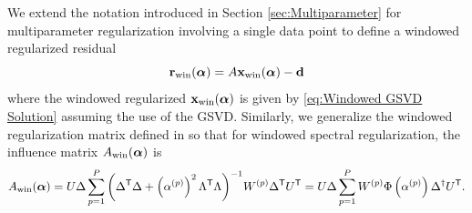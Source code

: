 \documentclass[12pt]{article}
\begin{document}
We extend the notation introduced in Section \ref{sec:Multiparameter} for multiparameter regularization involving a single data point to define a windowed regularized residual
\begin{equation}
\label{eq:Windowed regularized residual}
\mathbf{r}_{\text{win}}(\bm{\alpha}) = A\mathbf{x}_{\text{win}}(\bm{\alpha}) - \mathbf{d}
\end{equation}
where the windowed regularized $\mathbf{x}_{\text{win}}(\bm{\alpha})$ is given by \eqref{eq:Windowed GSVD Solution} assuming the use of the GSVD. Similarly, we generalize the windowed regularization matrix defined in \cite{ChungEasleyOLeary} so that for windowed spectral regularization, the influence matrix $A_{\text{win}}(\bm{\alpha})$ is
\[A_{\text{win}}(\bm{\alpha}) = U\Delta\sum_{p=1}^{P}{\left({\Delta}^\mathsf{T}\Delta + \left(\alpha^{(p)}\right)^2 {\Lambda}^\mathsf{T}\Lambda\right)}^{-1}W^{(p)}{\Delta}^\mathsf{T}{U}^\mathsf{T} = U\Delta\sum_{p=1}^{P}W^{(p)}\Phi\left(\alpha^{(p)}\right){\Delta}^\dagger{U}^\mathsf{T}.\]
\end{document}
